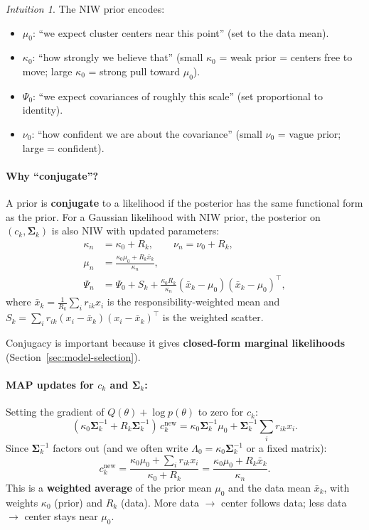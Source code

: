 \documentclass[11pt]{article}
\theoremstyle{definition}
\theoremstyle{plain}
\theoremstyle{remark}
\newtheorem{intuition}{Intuition}[section]
\newcommand{\Sv}{\boldsymbol{\Sigma}}
\begin{document}
\begin{intuition}
The NIW prior encodes:
\begin{itemize}[leftmargin=*,itemsep=0pt]
  \item $\mu_0$: ``we expect cluster centers near this point'' (set to the data mean).
  \item $\kappa_0$: ``how strongly we believe that'' (small $\kappa_0$ = weak prior = centers free to move; large $\kappa_0$ = strong pull toward $\mu_0$).
  \item $\Psi_0$: ``we expect covariances of roughly this scale'' (set proportional to identity).
  \item $\nu_0$: ``how confident we are about the covariance'' (small $\nu_0$ = vague prior; large = confident).
\end{itemize}
\end{intuition}

\paragraph{Why ``conjugate''?} A prior is \textbf{conjugate} to a likelihood if the posterior has the same functional form as the prior. For a Gaussian likelihood with NIW prior, the posterior on $(c_k,\Sv_k)$ is also NIW with updated parameters:
\begin{align}
  \kappa_n &= \kappa_0+R_k, \qquad \nu_n = \nu_0+R_k, \\
  \mu_n &= \frac{\kappa_0\mu_0+R_k\bar{x}_k}{\kappa_n}, \label{eq:niw-post-mean} \\
  \Psi_n &= \Psi_0 + S_k + \frac{\kappa_0 R_k}{\kappa_n}(\bar{x}_k-\mu_0)(\bar{x}_k-\mu_0)^\top, \label{eq:niw-post-psi}
\end{align}
where $\bar{x}_k=\frac{1}{R_k}\sum_i r_{ik}x_i$ is the responsibility-weighted mean and $S_k=\sum_i r_{ik}(x_i-\bar{x}_k)(x_i-\bar{x}_k)^\top$ is the weighted scatter.

Conjugacy is important because it gives \textbf{closed-form marginal likelihoods} (Section~\ref{sec:model-selection}).

\paragraph{MAP updates for $c_k$ and $\Sv_k$:}

Setting the gradient of $Q(\theta)+\log p(\theta)$ to zero for $c_k$:
\begin{equation}
  (\kappa_0\Sv_k^{-1}+R_k\Sv_k^{-1})\,c_k^{\mathrm{new}} = \kappa_0\Sv_k^{-1}\mu_0 + \Sv_k^{-1}\sum_i r_{ik}x_i.
\end{equation}
Since $\Sv_k^{-1}$ factors out (and we often write $\Lambda_0=\kappa_0\Sv_k^{-1}$ or a fixed matrix):
\begin{equation}
  c_k^{\mathrm{new}} = \frac{\kappa_0\mu_0+\sum_i r_{ik}x_i}{\kappa_0+R_k} = \frac{\kappa_0\mu_0+R_k\bar{x}_k}{\kappa_n}.
\end{equation}
This is a \textbf{weighted average} of the prior mean $\mu_0$ and the data mean $\bar{x}_k$, with weights $\kappa_0$ (prior) and $R_k$ (data). More data $\to$ center follows data; less data $\to$ center stays near $\mu_0$.
\end{document}
